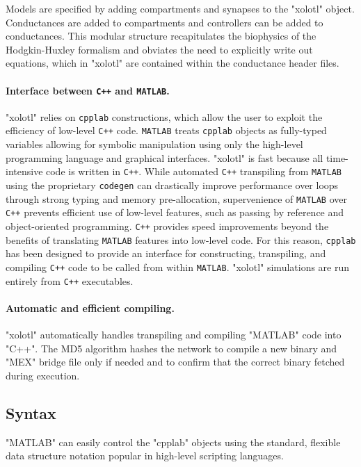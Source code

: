 \documentclass{frontiersSCNS} %
\begin{document}
Models are specified by adding compartments and synapses to the "xolotl" object. Conductances are added to compartments and controllers can be added to conductances. This modular structure recapitulates the biophysics of the Hodgkin-Huxley formalism and obviates the need to explicitly write out equations, which in "xolotl" are contained within the conductance header files.

\paragraph{Interface between \texttt{C++} and \texttt{MATLAB}.}

"xolotl" relies on \texttt{cpplab} constructions, which allow the user to exploit the efficiency of low-level \texttt{C++} code. \texttt{MATLAB} treats \texttt{cpplab} objects as fully-typed variables allowing for symbolic manipulation using only the high-level programming language and graphical interfaces. "xolotl" is fast because all time-intensive code is written in \texttt{C++}. While automated \texttt{C++} transpiling from \texttt{MATLAB} using the proprietary \texttt{codegen} can drastically improve performance over loops through strong typing and memory pre-allocation, supervenience of \texttt{MATLAB} over \texttt{C++} prevents efficient use of low-level features, such as passing by reference and object-oriented programming. \texttt{C++} provides speed improvements beyond the benefits of translating \texttt{MATLAB} features into low-level code. For this reason, \texttt{cpplab} has been designed to provide an interface for constructing, transpiling, and compiling \texttt{C++} code to be called from within \texttt{MATLAB}. "xolotl" simulations are run entirely from \texttt{C++} executables. 

\paragraph{Automatic and efficient compiling.}
"xolotl" automatically handles transpiling and compiling "MATLAB" code into "C++". The MD5 algorithm hashes the network to compile a new binary and "MEX" bridge file only if needed and to confirm that the correct binary fetched during execution.

\subsection{Syntax}

"MATLAB" can easily control the "cpplab" objects using the standard, flexible data structure notation popular in high-level scripting languages.
\end{document}
